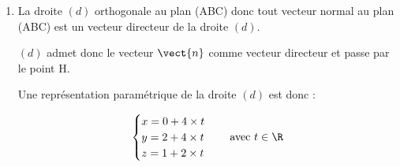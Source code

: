 \begin{enumerate}
	Comme le repère est orthonormé, le produit scalaire peut se calculer avec la formule analytique :
	\quad $\vectt{AB}\cdot\vectt{AH} = 1 \times (-1) +1 \times 2 -4 \times (-2) = -1 +2 +8=9$.


	Comme on est dans un repère orthonormé :

	$\mathrm{AB}=\sqrt{ {x_{\vectt{AB}}}^2  + {y_{\vectt{AB}}}^2  +{z_{\vectt{AB}}}^2 } = \sqrt{ 1^2+ 1^2+(-4)^2}= \sqrt{1+1+16}=\sqrt{18} = 3 \sqrt{2}$.

	et de même :  $\mathrm{AH}=\sqrt{  (-1)^2 +2^2+(-2)^2}= \sqrt{ 1+4+4}= \sqrt{9}=3$.

	L'expression trigonométrique du produit scalaire donne :

	$\begin{aligned}
		\vectt{AB}\cdot\vectt{AH}
		&= \mathrm{AB} \times \mathrm{AH} \times \cos\left(\widehat{\mathrm{BAH}}\right)
	\end{aligned}$

	donc, avec les valeurs connues :\quad $\begin{aligned}[t]
		\vectt{AB}\cdot\vectt{AH}
		&= 3 \sqrt{2} \times 3\times \cos\left(\widehat{\mathrm{BAH}}\right)\\
		&=  9 \sqrt{2} \cos\left(\widehat{\mathrm{BAH}}\right)
	\end{aligned}$

	On a donc deux expressions du même produit scalaire, ce qui donne :

	$ 9= 9 \sqrt{2} \cos\left(\widehat{\mathrm{BAH}}\right) \iff \cos\left(\widehat{\mathrm{BAH}}\right) = \dfrac{1}{\sqrt{2}} = \dfrac{\sqrt{2}}{2} $

	D'où : $\widehat{\mathrm{BAH}} =45 ^\circ$.






	\item La droite $(d)$ orthogonale au plan (ABC)  donc tout vecteur normal au plan (ABC) est un vecteur directeur de la droite $(d)$.

	$(d)$ admet donc le vecteur $\vect{n}$ comme vecteur directeur et passe par le point H.

	Une représentation paramétrique de la droite $(d)$ est donc :

	\[\begin{cases}
		x=0 + 4 \times   t\\
		y=2 + 4 \times t \\
		z=1 +2 \times  t
	\end{cases} \quad \text{avec } t \in \R\]


\end{enumerate}

